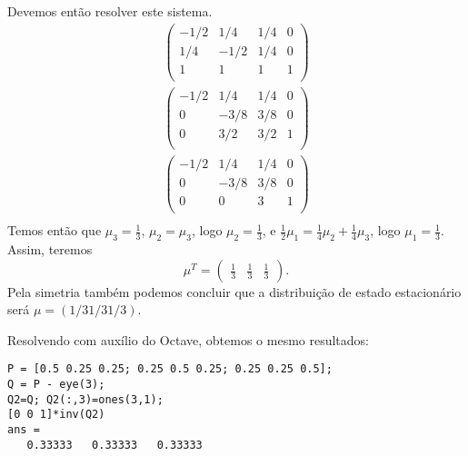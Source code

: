 \begin{questions}
\begin{solution}
\begin{parts}
Devemos então resolver este sistema.
\begin{eqnarray}
\left( \begin{array}{ccc|c}
-1/2 & 1/4  & 1/4 & 0 \\
1/4  & -1/2 & 1/4 & 0 \\
1    &   1  & 1 & 1 \\
\end{array} \right)\\
\left( \begin{array}{ccc|c}
-1/2 & 1/4  & 1/4 & 0 \\
  0  & -3/8 & 3/8 & 0 \\
  0  & 3/2  & 3/2 & 1 \\
\end{array} \right)\\
\left( \begin{array}{ccc|c}
-1/2 & 1/4  & 1/4 & 0 \\
  0  & -3/8 & 3/8 & 0 \\
  0  &   0  & 3   & 1 \\
\end{array} \right)\\
\end{eqnarray}
Temos então que $\mu_3 = \frac{1}{3}$, $\mu_2 = \mu_3$, logo $\mu_2 = \frac{1}{3}$, e
$\frac{1}{2} \mu_1 = \frac{1}{4} \mu_2 + \frac{1}{4} \mu_3$, logo $\mu_1 = \frac{1}{3}$.
Assim, teremos
\begin{equation}
\mu^T = \begin{pmatrix} \frac{1}{3} & \frac{1}{3} & \frac{1}{3} \end{pmatrix}  .
\end{equation}
Pela simetria também podemos concluir que a distribuição de estado estacionário será
$\mu = (1/3 1/3 1/3)$.



Resolvendo com auxílio do Octave, obtemos o mesmo resultados:
\begin{verbatim}
P = [0.5 0.25 0.25; 0.25 0.5 0.25; 0.25 0.25 0.5];
Q = P - eye(3);
Q2=Q; Q2(:,3)=ones(3,1);
[0 0 1]*inv(Q2)
ans =
   0.33333   0.33333   0.33333
\end{verbatim}




\end{parts}
\end{solution}
\end{questions}
